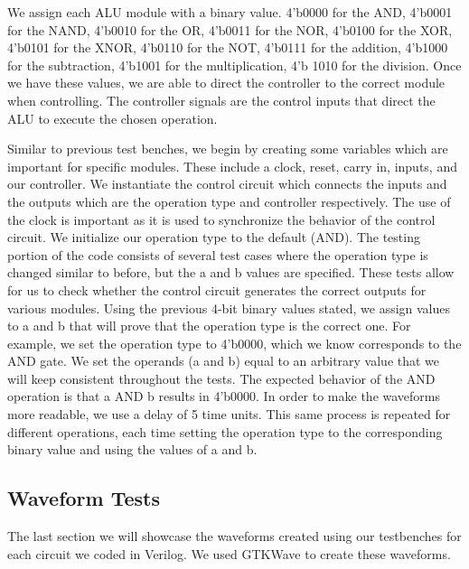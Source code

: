 \documentclass[12pt]{article}
\begin{document}
We assign each ALU module with a binary value. 4'b0000 for the AND, 4'b0001 for the NAND, 4'b0010 for the OR, 4'b0011 for the NOR, 4'b0100 for the XOR, 4'b0101 for the XNOR, 4'b0110 for the NOT, 4'b0111 for the addition, 4'b1000 for the subtraction, 4'b1001 for the multiplication, 4'b 1010 for the division. Once we have these values, we are able to direct the controller to the correct module when controlling. The controller signals are the control inputs that direct the ALU to execute the chosen operation.



\newpage 
Similar to previous test benches, we begin by creating some variables which are important for specific modules. These include a clock, reset, carry in, inputs, and our controller. We instantiate the control circuit which connects the inputs and the outputs which are the operation type and controller respectively. The use of the clock is important as it is used to synchronize the behavior of the control circuit. We initialize our operation type to the default (AND). The testing portion of the code consists of several test cases where the operation type is changed similar to before, but the a and b values are specified. These tests allow for us to check whether the control circuit generates the correct outputs for various modules. Using the previous 4-bit binary values stated, we assign values to a and b that will prove that the operation type is the correct one. For example, we set the operation type to 4'b0000, which we know corresponds to the AND gate. We set the operands (a and b) equal to an arbitrary value that we will keep consistent throughout the tests. The expected behavior of the AND operation is that a AND b results in 4'b0000. In order to make the waveforms more readable, we use a delay of 5 time units. This same process is repeated for different operations, each time setting the operation type to the corresponding binary value and using the values of a and b.











\subsection{Waveform Tests}

The last section we will showcase the waveforms created using our testbenches for each circuit we coded in Verilog. We used GTKWave to create these waveforms.
\end{document}
